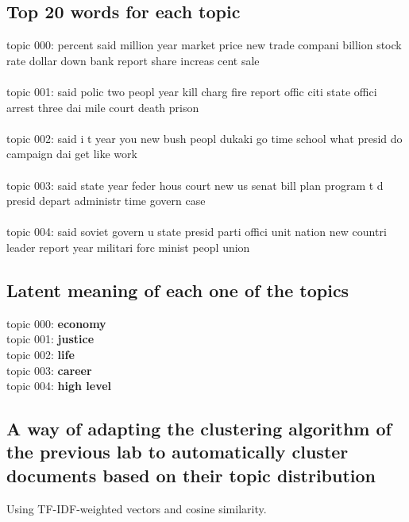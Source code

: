 \documentclass[11pt]{article} %
\begin{document}
\subsection{Top 20 words for each topic}
topic 000: percent said million year market price new trade compani billion stock rate dollar down bank report share increas cent sale\\ \\
topic 001: said polic two peopl year kill charg fire report offic citi state offici arrest three dai mile court death prison\\ \\
topic 002: said i t year you new bush peopl dukaki go time school what presid do campaign dai get like work\\ \\
topic 003: said state year feder hous court new us senat bill plan program t d presid depart administr time govern case\\ \\
topic 004: said soviet govern u state presid parti offici unit nation new countri leader report year militari forc minist peopl union\\
\subsection{Latent meaning of each one of the topics}
topic 000: \textbf{economy} \\
topic 001: \textbf{justice} \\
topic 002: \textbf{life} \\
topic 003: \textbf{career} \\
topic 004: \textbf{high level} \\
\subsection{A way of adapting the clustering algorithm of the previous lab to automatically cluster
documents based on their topic distribution}
Using TF-IDF-weighted vectors and cosine similarity.
\end{document}
